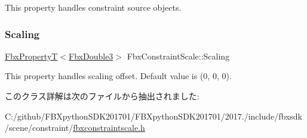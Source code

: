 This property handles constraint source objects. \mbox{\label{class_fbx_constraint_scale_a0c8bd160ee16da64bf998a612bb11a5b}} 
\subsubsection{\texorpdfstring{Scaling}{Scaling}}
{\footnotesize\ttfamily \hyperlink{class_fbx_property_t}{Fbx\+PropertyT}$<$\hyperlink{fbxtypes_8h_ae0a96f14cde566774c7553aa7523b7a7}{Fbx\+Double3}$>$ Fbx\+Constraint\+Scale\+::\+Scaling}

This property handles scaling offset. Default value is (0, 0, 0). 

このクラス詳解は次のファイルから抽出されました\+:\begin{DoxyCompactItemize}
\item 
C\+:/github/\+F\+B\+Xpython\+S\+D\+K201701/\+F\+B\+Xpython\+S\+D\+K201701/2017./include/fbxsdk/scene/constraint/\hyperlink{fbxconstraintscale_8h}{fbxconstraintscale.\+h}\end{DoxyCompactItemize}
